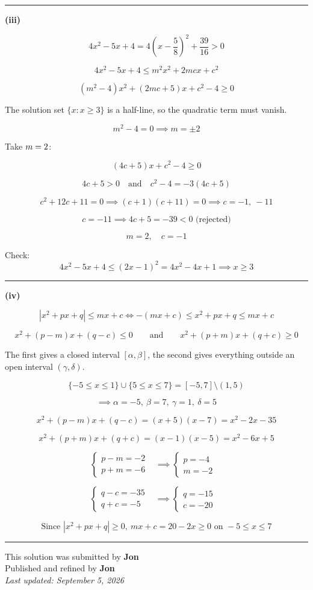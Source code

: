 \documentclass[12pt]{article}
\begin{document}
\bigskip\hrule\bigskip

\textbf{(iii)}

$$4x^2-5x+4=4\left(x-\frac58\right)^2+\frac{39}{16}>0$$

$$4x^2-5x+4\leq m^2x^2+2mcx+c^2$$

$$\left(m^2-4\right)x^2+(2mc+5)x+c^2-4\geq0$$

The solution set $\{x:x\geq3\}$ is a half-line, so the quadratic term must vanish.

$$m^2-4=0\implies m=\pm2$$

Take $\displaystyle m=2$:

$$(4c+5)x+c^2-4\geq0$$

$$4c+5>0\quad\text{and}\quad c^2-4=-3(4c+5)$$

$$c^2+12c+11=0\implies (c+1)(c+11)=0\implies c=-1,\ -11$$

$$c=-11\implies 4c+5=-39<0\text{ (rejected)}$$

$$\boxed{m=2,\quad c=-1}$$

Check:
$$4x^2-5x+4\leq(2x-1)^2=4x^2-4x+1\implies x\geq3$$

\bigskip\hrule\bigskip

\textbf{(iv)}

$$\left|x^2+px+q\right|\leq mx+c
\iff -(mx+c)\leq x^2+px+q\leq mx+c$$

$$x^2+(p-m)x+(q-c)\leq0\qquad\text{and}\qquad x^2+(p+m)x+(q+c)\geq0$$

The first gives a closed interval $[\alpha,\beta]$, the second gives everything outside an open interval $(\gamma,\delta)$.

$$\{-5\leq x\leq1\}\cup\{5\leq x\leq7\}=[-5,7]\setminus(1,5)$$

$$\implies \alpha=-5,\ \beta=7,\ \gamma=1,\ \delta=5$$

$$x^2+(p-m)x+(q-c)=(x+5)(x-7)=x^2-2x-35$$

$$x^2+(p+m)x+(q+c)=(x-1)(x-5)=x^2-6x+5$$


$$
\begin{cases}
p-m=-2 &\\
p+m=-6 &
\end{cases}
\implies
\begin{cases}
p=-4 &\\
m=-2 &
\end{cases}
$$

$$
\begin{cases}
q-c=-35 &\\
q+c=-5 &
\end{cases}
\implies
\begin{cases}
q=-15 &\\
c=-20 &
\end{cases}
$$

$$\text{Since }\left|x^2+px+q\right|\geq 0,\  mx+c=20-2x\geq0\text{ on }-5\leq x\leq7$$

\bigskip
\hrule
\begin{center}
    This solution was submitted by \textbf{Jon}\\[4pt]
    Published and refined by \textbf{Jon}\\[8pt]
    \textit{Last updated: September 5, 2026}
\end{center}
\end{document}
